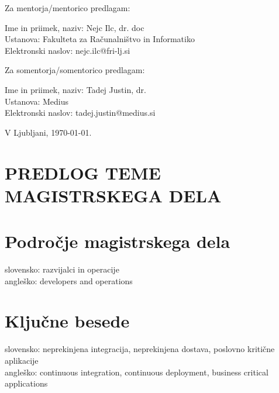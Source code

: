 \documentclass[a4paper, 12pt]{article}
\begin{document}
Za mentorja/mentorico predlagam:

\hfill\begin{minipage}{\dimexpr\textwidth-2cm}
Ime in priimek, naziv: Nejc Ilc, dr. doc \\
Ustanova: Fakulteta za Računalništvo in Informatiko \\
Elektronski naslov: nejc.ilc@fri-lj.si
\end{minipage}

Za somentorja/somentorico predlagam:

\hfill\begin{minipage}{\dimexpr\textwidth-2cm}
Ime in priimek, naziv: Tadej Justin, dr. \\
Ustanova: Medius \\
Elektronski naslov:  tadej.justin@medius.si \\
\end{minipage}




\bigskip


\hfill V Ljubljani, \today.
%




\clearpage
\section*{PREDLOG TEME MAGISTRSKEGA DELA}

\section{Področje magistrskega dela}

slovensko: razvijalci in operacije \\
angleško: developers and operations


\section{Ključne besede}

slovensko: neprekinjena integracija, neprekinjena dostava, poslovno kritične aplikacije   \\
angleško: continuous integration, continuous deployment, business critical applications
\end{document}
